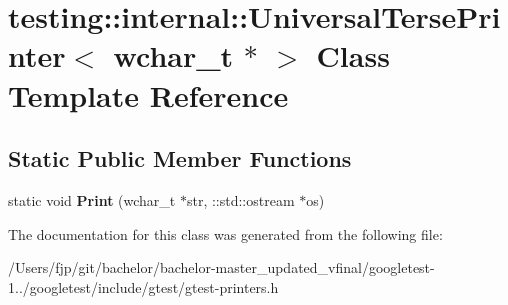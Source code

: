 \hypertarget{classtesting_1_1internal_1_1_universal_terse_printer_3_01wchar__t_01_5_01_4}{}\section{testing\+:\+:internal\+:\+:Universal\+Terse\+Printer$<$ wchar\+\_\+t $\ast$ $>$ Class Template Reference}
\label{classtesting_1_1internal_1_1_universal_terse_printer_3_01wchar__t_01_5_01_4}
\subsection*{Static Public Member Functions}
\begin{DoxyCompactItemize}
\item 
\mbox{\label{classtesting_1_1internal_1_1_universal_terse_printer_3_01wchar__t_01_5_01_4_a9cdf673b44d19e6879253f30f11cd740}} 
static void {\bfseries Print} (wchar\+\_\+t $\ast$str, \+::std\+::ostream $\ast$os)
\end{DoxyCompactItemize}


The documentation for this class was generated from the following file\+:\begin{DoxyCompactItemize}
\item 
/\+Users/fjp/git/bachelor/bachelor-\/master\+\_\+updated\+\_\+vfinal/googletest-\/1../googletest/include/gtest/gtest-\/printers.\+h\end{DoxyCompactItemize}

